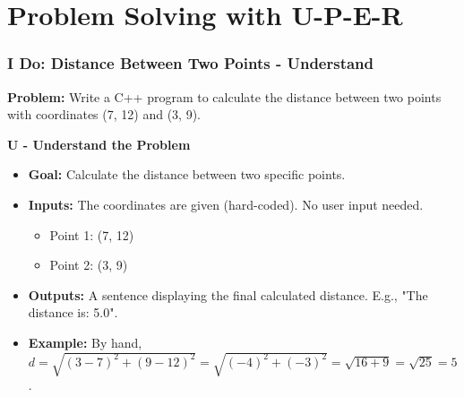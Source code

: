 \documentclass{beamer}
\begin{document}
\section{Problem Solving with U-P-E-R}

\begin{frame}
\frametitle{I Do: Distance Between Two Points - Understand}
\textbf{Problem:} Write a C++ program to calculate the distance between two points with coordinates \alert{(7, 12)} and \alert{(3, 9)}.

\vfill
\textbf{U - Understand the Problem}
\begin{itemize}
    \item \textbf{Goal:} Calculate the distance between two specific points.
    \item \textbf{Inputs:} The coordinates are given (hard-coded). No user input needed.
    \begin{itemize}
        \item Point 1: (7, 12)
        \item Point 2: (3, 9)
    \end{itemize}
    \item \textbf{Outputs:} A sentence displaying the final calculated distance. E.g., "The distance is: 5.0".
    \item \textbf{Example:} By hand, $d = \sqrt{(3 - 7)^2 + (9 - 12)^2} = \sqrt{(-4)^2 + (-3)^2} = \sqrt{16 + 9} = \sqrt{25} = 5$.
\end{itemize}
\end{frame}
\end{document}
